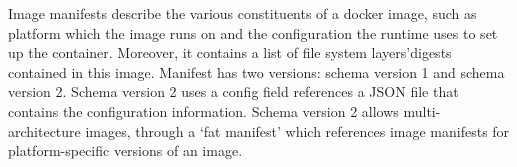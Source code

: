 

%
%
%
%
%



%
%
Image manifests describe the various constituents of a docker image, such as platform which the image runs on and the configuration the runtime uses to set up the container.
%
Moreover, it contains a list of file system layers'digests contained in this image.
%
Manifest has two versions: schema version 1 and schema version 2.
%
Schema version 2 uses a config field references a JSON file that contains the configuration information.
%
Schema version 2 allows multi-architecture images, through a `fat manifest' which references image manifests for platform-specific versions of an image.





